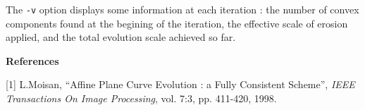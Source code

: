 \medskip

The \verb+-v+ option displays some information at each iteration :
the number of convex components found at the begining of the iteration,
the effective scale of erosion applied, and the total evolution scale
achieved so far.

\bigskip

{\Large \bf References}

\medskip

[1] L.Moisan, ``Affine Plane Curve Evolution : a Fully Consistent Scheme'', 
{\it IEEE Transactions On Image Processing}, vol. 7:3, pp. 411-420, 1998.
